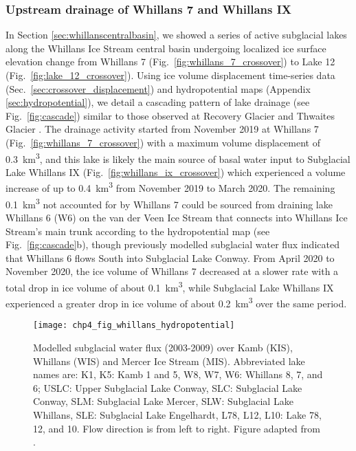 \subsubsection{Upstream drainage of Whillans 7 and Whillans IX}

In Section \ref{sec:whillanscentralbasin}, we showed a series of active subglacial lakes along the Whillans Ice Stream central basin undergoing localized ice surface elevation change from Whillans 7 (Fig.~\ref{fig:whillans_7_crossover}) to Lake 12 (Fig.~\ref{fig:lake_12_crossover}).
Using ice volume displacement time-series data (Sec.~\ref{sec:crossover_displacement}) and hydropotential maps (Appendix \ref{sec:hydropotential}), we detail a cascading pattern of lake drainage (see Fig.~\ref{fig:cascade}) similar to those observed at Recovery Glacier \citep{DowDynamicsActiveSubglacial2018} and Thwaites Glacier \citep{SmithConnectedsubglaciallake2017}.
The drainage activity started from November 2019 at Whillans 7 (Fig.~\ref{fig:whillans_7_crossover}) with a maximum volume displacement of \SI{0.3}{\kilo\metre\cubed}, and this lake is likely the main source of basal water input to Subglacial Lake Whillans IX (Fig.~\ref{fig:whillans_ix_crossover}) which experienced a volume increase of up to \SI{0.4}{\kilo\metre\cubed} from November 2019 to March 2020.
The remaining \SI{0.1}{\kilo\metre\cubed} not accounted for by Whillans 7 could be sourced from draining lake Whillans 6 (W6) on the van der Veen Ice Stream that connects into Whillans Ice Stream's main trunk according to the hydropotential map (see Fig.~\ref{fig:cascade}b), though previously modelled subglacial water flux \citep[Fig.~\ref{fig:whillans_hydropotential},][]{CarterEvidencerapidsubglacial2013,LeBrocqsubglacialwaterflowmodel2009} indicated that Whillans 6 flows South into Subglacial Lake Conway.
From April 2020 to November 2020, the ice volume of Whillans 7 decreased at a slower rate with a total drop in ice volume of about \SI{0.1}{\kilo\metre\cubed}, while Subglacial Lake Whillans IX experienced a greater drop in ice volume of about \SI{0.2}{\kilo\metre\cubed} over the same period.

\begin{figure}[htbp]
  \centering
  \texttt{[image: chp4\_fig\_whillans\_hydropotential]}
  \caption[Modelled subglacial water flux (2003-2009) over Kamb, Whillans and Mercer Ice Stream]{
    Modelled subglacial water flux (2003-2009) over Kamb (KIS), Whillans (WIS) and Mercer Ice Stream (MIS).
    Abbreviated lake names are: K1, K5: Kamb 1 and 5, W8, W7, W6: Whillans 8, 7, and 6; USLC: Upper Subglacial Lake Conway, SLC: Subglacial Lake Conway, SLM: Subglacial Lake Mercer, SLW: Subglacial Lake Whillans, SLE: Subglacial Lake Engelhardt, L78, L12, L10: Lake 78, 12, and 10.
    Flow direction is from left to right.
    Figure adapted from \citet{CarterEvidencerapidsubglacial2013}.
  }
  \label{fig:whillans_hydropotential}
\end{figure}

